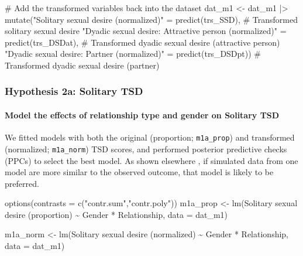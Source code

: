 \documentclass[
  bookmarksnumbered]{article}
\newenvironment{Shaded}{\begin{snugshade}}{\end{snugshade}}
\newcommand{\AttributeTok}[1]{\textcolor[rgb]{0.80,0.80,0.80}{#1}}
\newcommand{\CommentTok}[1]{\textcolor[rgb]{0.50,0.62,0.50}{#1}}
\newcommand{\FunctionTok}[1]{\textcolor[rgb]{0.94,0.94,0.56}{#1}}
\newcommand{\NormalTok}[1]{\textcolor[rgb]{0.80,0.80,0.80}{#1}}
\newcommand{\OtherTok}[1]{\textcolor[rgb]{0.94,0.94,0.56}{#1}}
\newcommand{\SpecialCharTok}[1]{\textcolor[rgb]{0.86,0.64,0.64}{#1}}
\newcommand{\StringTok}[1]{\textcolor[rgb]{0.80,0.58,0.58}{#1}}
\begin{document}
\begin{Shaded}
\begin{Highlighting}[]
\CommentTok{\# Add the transformed variables back into the dataset  }
\NormalTok{dat\_m1 }\OtherTok{\textless{}{-}}\NormalTok{ dat\_m1 }\SpecialCharTok{|\textgreater{}}  
  \FunctionTok{mutate}\NormalTok{(}\StringTok{"Solitary sexual desire (normalized)"} \OtherTok{=} 
           \FunctionTok{predict}\NormalTok{(trs\_SSD),  }\CommentTok{\# Transformed solitary sexual desire  }
         \StringTok{"Dyadic sexual desire: Attractive person (normalized)"} \OtherTok{=} 
           \FunctionTok{predict}\NormalTok{(trs\_DSDat),  }\CommentTok{\# Transformed dyadic sexual desire (attractive person)  }
         \StringTok{"Dyadic sexual desire: Partner (normalized)"} \OtherTok{=} 
           \FunctionTok{predict}\NormalTok{(trs\_DSDpt))  }\CommentTok{\# Transformed dyadic sexual desire (partner)  }
\end{Highlighting}
\end{Shaded}

\subsubsection{Hypothesis 2a: Solitary TSD}\label{hypothesis2a}

\paragraph{Model the effects of relationship type and gender on Solitary TSD}\label{model-the-effects-of-relationship-type-and-gender-on-solitary-tsd-3}

We fitted models with both the original (proportion; \texttt{m1a\_prop}) and transformed (normalized; \texttt{m1a\_norm}) TSD scores, and performed posterior predictive checks (PPCs) to select the best model. As shown elsewhere \autocite[e.g.,][]{gabryVisualizationBayesianWorkflow2019}, if simulated data from one model are more similar to the observed outcome, that model is likely to be preferred.

\begin{Shaded}
\begin{Highlighting}[]
\FunctionTok{options}\NormalTok{(}\AttributeTok{contrasts =} \FunctionTok{c}\NormalTok{(}\StringTok{"contr.sum"}\NormalTok{,}\StringTok{"contr.poly"}\NormalTok{))}
\NormalTok{m1a\_prop }\OtherTok{\textless{}{-}} \FunctionTok{lm}\NormalTok{(}\StringTok{\textasciigrave{}}\AttributeTok{Solitary sexual desire (proportion)}\StringTok{\textasciigrave{}} \SpecialCharTok{\textasciitilde{}}\NormalTok{ Gender }\SpecialCharTok{*}\NormalTok{ Relationship,}
            \AttributeTok{data =}\NormalTok{ dat\_m1)}

\NormalTok{m1a\_norm }\OtherTok{\textless{}{-}} \FunctionTok{lm}\NormalTok{(}\StringTok{\textasciigrave{}}\AttributeTok{Solitary sexual desire (normalized)}\StringTok{\textasciigrave{}} \SpecialCharTok{\textasciitilde{}}\NormalTok{ Gender }\SpecialCharTok{*}\NormalTok{ Relationship,}
           \AttributeTok{data =}\NormalTok{ dat\_m1)}
\end{Highlighting}
\end{Shaded}
\end{document}
